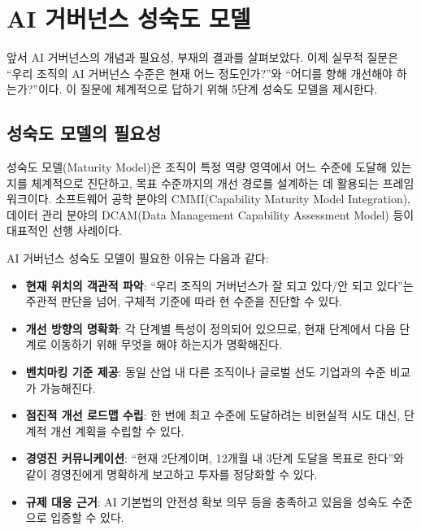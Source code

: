 \section{AI 거버넌스 성숙도 모델}
\label{sec:1.4}

앞서 AI 거버넌스의 개념과 필요성, 부재의 결과를 살펴보았다. 이제 실무적 질문은 ``우리 조직의 AI 거버넌스 수준은 현재 어느 정도인가?''와 ``어디를 향해 개선해야 하는가?''이다. 이 질문에 체계적으로 답하기 위해 5단계 성숙도 모델을 제시한다.\cite{batool2025ai_governance}

\subsection{성숙도 모델의 필요성}
성숙도 모델(Maturity Model)은 조직이 특정 역량 영역에서 어느 수준에 도달해 있는지를 체계적으로 진단하고, 목표 수준까지의 개선 경로를 설계하는 데 활용되는 프레임워크이다.\cite{cmmi2018model} 소프트웨어 공학 분야의 CMMI(Capability Maturity Model Integration), 데이터 관리 분야의 DCAM(Data Management Capability Assessment Model) 등이 대표적인 선행 사례이다.

AI 거버넌스 성숙도 모델이 필요한 이유는 다음과 같다:

\begin{itemize}
    \item \textbf{현재 위치의 객관적 파악}: ``우리 조직의 거버넌스가 잘 되고 있다/안 되고 있다''는 주관적 판단을 넘어, 구체적 기준에 따라 현 수준을 진단할 수 있다.
    \item \textbf{개선 방향의 명확화}: 각 단계별 특성이 정의되어 있으므로, 현재 단계에서 다음 단계로 이동하기 위해 무엇을 해야 하는지가 명확해진다.
    \item \textbf{벤치마킹 기준 제공}: 동일 산업 내 다른 조직이나 글로벌 선도 기업과의 수준 비교가 가능해진다.
    \item \textbf{점진적 개선 로드맵 수립}: 한 번에 최고 수준에 도달하려는 비현실적 시도 대신, 단계적 개선 계획을 수립할 수 있다.
    \item \textbf{경영진 커뮤니케이션}: ``현재 2단계이며, 12개월 내 3단계 도달을 목표로 한다''와 같이 경영진에게 명확하게 보고하고 투자를 정당화할 수 있다.
    \item \textbf{규제 대응 근거}: AI 기본법의 안전성 확보 의무 등을 충족하고 있음을 성숙도 수준으로 입증할 수 있다.
\end{itemize}

